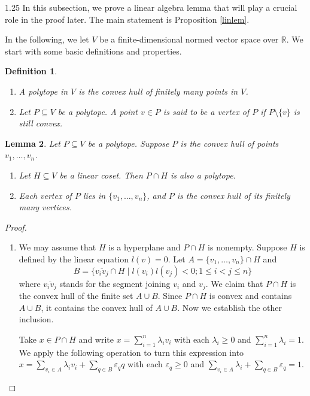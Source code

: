 \documentclass[12pt]{article}
\newtheorem{definition}{Definition}[section]
\newtheorem{lemma}[definition]{Lemma}
\begin{document}
\begin{spacing}{1.25}
In this subsection, we prove a linear algebra lemma that will play a crucial role in the proof later. The main statement is Proposition \ref{linlem}.

In the following, we let $V$ be a finite-dimensional normed vector space over $\mathbb{R}$. We start with some basic definitions and properties.

\begin{definition}\label{polydef}
\begin{enumerate}
\item
A \emph{polytope} in $V$ is the convex hull of finitely many points in $V$.
\item
Let $P\subseteq V$ be a polytope. A point $v\in P$ is said to be a \emph{vertex} of $P$ if $P\setminus\{v\}$ is still convex.
\end{enumerate}
\end{definition}

\begin{lemma}\label{polylem}
Let $P\subseteq V$ be a polytope. Suppose $P$ is the convex hull of points $v_1,\dots,v_n$.
\begin{enumerate}
\item
Let $H\subseteq V$ be a linear coset. Then $P\cap H$ is also a polytope.
\item
Each vertex of $P$ lies in $\{v_1,\dots,v_n\}$, and $P$ is the convex hull of its finitely many vertices.
\end{enumerate}
\end{lemma}

\begin{proof}
\begin{enumerate}
\item
We may assume that $H$ is a hyperplane and $P\cap H$ is nonempty. Suppose $H$ is defined by the linear equation $l(v)=0$. Let $A=\{v_1,\dots,v_n\}\cap H$ and
$$
B=\{\overline{v_iv_j}\cap H\mid l(v_i)l(v_j)<0;1\leq i<j\leq n\}
$$
where $\overline{v_iv_j}$ stands for the segment joining $v_i$ and $v_j$. We claim that $P\cap H$ is the convex hull of the finite set $A\cup B$. Since $P\cap H$ is convex and contains $A\cup B$, it contains the convex hull of $A\cup B$. Now we establish the other inclusion.

Take $x\in P\cap H$ and write $x=\sum\limits_{i=1}^n\lambda_iv_i$ with each $\lambda_i\geq0$ and $\sum\limits_{i=1}^n\lambda_i=1$. We apply the following operation to turn this expression into $x=\sum\limits_{v_i\in A}\lambda_iv_i+\sum\limits_{q\in B}\varepsilon_qq$ with each $\varepsilon_q\geq0$ and $\sum\limits_{v_i\in A}\lambda_i+\sum\limits_{q\in B}\varepsilon_q=1$.


\end{enumerate}
\end{proof}
\end{spacing}
\end{document}
